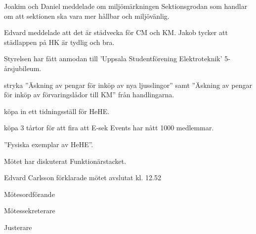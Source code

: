\documentclass[10pt]{article}
\def\mo{Edvard Carlsson}
\def\ms{Mattias Lundström}
\def\ji{Theo Nyman}
\begin{document}
\begin{paragrafer}


Joakim och Daniel meddelade om miljömärkningen Sektionsgrodan som handlar om att sektionen ska vara mer hållbar och miljövänlig. 

Edvard meddelade att det är städvecka för CM och KM. Jakob tycker att städlappen på HK är tydlig och bra. 


Styrelsen har fått anmodan till 'Uppsala Studentförening Elektroteknik' 5-årsjubileum.


\Mba stryka ''Äskning av pengar för inköp av nya ljusslingor'' samt ''Äskning av pengar för inköp av förvaringslådor till KM'' från handlingarna. 

\Mba köpa in ett tidningsställ för HeHE. 

\Mba köpa 3 tårtor för att fira att E-sek Events har nått 1000 medlemmar. 

\Fbs ''Fysiska exemplar av HeHE''.

Mötet har diskuterat Funktionärstacket. 

{\mo} förklarade mötet avslutat kl. 12.52
\end{paragrafer}

\hidesignfoot
\begin{signatures}{3}
\signature{\mo}{Mötesordförande}
\signature{\ms}{Mötessekreterare}
\signature{\ji}{Justerare}
\end{signatures}
\end{document}
